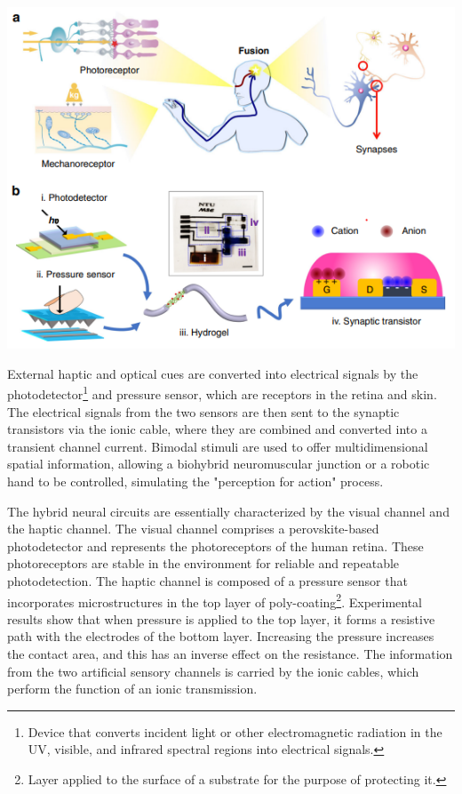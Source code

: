 \documentclass[12pt, a4paper]{article}
\begin{document}
\begin{multicols}{2}
\vspace*{3mm}
\captionsetup{type=figure}
\includegraphics[width=.49\textwidth]{neural-haptic.png}
\vspace*{3mm}

External haptic and optical cues are converted into electrical signals by the photodetector\footnote{Device that converts incident light or other electromagnetic radiation in the UV, visible, and infrared spectral regions into electrical signals.} and pressure sensor, which are receptors in the retina and skin. The electrical signals from the two sensors are then sent to the synaptic transistors via the ionic cable, where they are combined and converted into a transient channel current. Bimodal stimuli are used to offer multidimensional spatial information, allowing a biohybrid neuromuscular junction or a robotic hand to be controlled, simulating the "perception for action" process\cite{neural-haptic}.

The hybrid neural circuits are essentially characterized by the visual channel and the haptic channel. The visual channel comprises a perovskite-based photodetector and represents the photoreceptors of the human retina. These photoreceptors are stable in the environment for reliable and repeatable photodetection. The haptic channel is composed of a pressure sensor that incorporates microstructures in the top layer of poly-coating\footnote{Layer applied to the surface of a substrate for the purpose of protecting it.}. Experimental results show that when pressure is applied to the top layer, it forms a resistive path with the electrodes of the bottom layer. Increasing the pressure increases the contact area, and this has an inverse effect on the resistance. The information from the two artificial sensory channels is carried by the ionic cables, which perform the function of an ionic transmission\cite{neural-haptic}.


\end{multicols}
\end{document}
